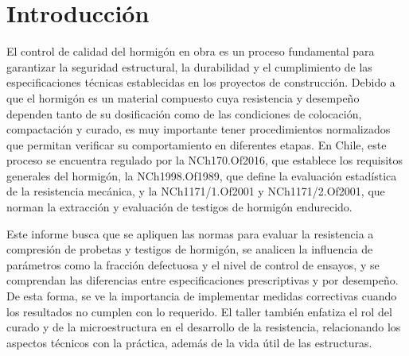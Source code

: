 \section{Introducción}

El control de calidad del hormigón en obra es un proceso fundamental para garantizar la seguridad estructural, la durabilidad y el cumplimiento de las especificaciones técnicas establecidas en los proyectos de construcción. Debido a que el hormigón es un material compuesto cuya resistencia y desempeño dependen tanto de su dosificación como de las condiciones de colocación, compactación y curado, es muy importante tener procedimientos normalizados que permitan verificar su comportamiento en diferentes etapas. En Chile, este proceso se encuentra regulado por la NCh170.Of2016, que establece los requisitos generales del hormigón, la NCh1998.Of1989, que define la evaluación estadística de la resistencia mecánica, y la NCh1171/1.Of2001 y NCh1171/2.Of2001, que norman la extracción y evaluación de testigos de hormigón endurecido.

Este informe busca que se apliquen las normas para evaluar la resistencia a compresión de probetas y testigos de hormigón, se analicen la influencia de parámetros como la fracción defectuosa y el nivel de control de ensayos, y se comprendan las diferencias entre especificaciones prescriptivas y por desempeño. De esta forma, se ve la importancia de implementar medidas correctivas cuando los resultados no cumplen con lo requerido. El taller también enfatiza el rol del curado y de la microestructura en el desarrollo de la resistencia, relacionando los aspectos técnicos con la práctica, además de la vida útil de las estructuras.


